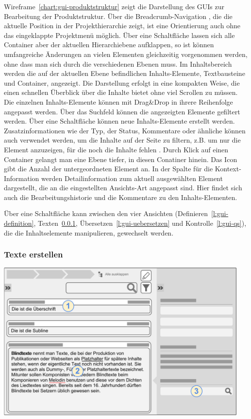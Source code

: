 Wireframe~\ref{chart:gui-produktstruktur} zeigt die Darstellung des GUIs zur Bearbeitung der Produktstruktur. Über die Breadcrumb-Navigation , die die aktuelle Position in der Projekthierarchie zeigt, ist eine Orientierung auch ohne das eingeklappte Projektmenü möglich. Über eine Schaltfläche lassen sich alle Container aber der aktuellen Hierarchiebene aufklappen, so ist können umfangreiche Änderungen an vielen Elementen gleichzeitig vorgenommen werden, ohne dass man sich durch die verschiedenen Ebenen  muss. Im Inhaltsbereich  werden die auf der aktuellen Ebene befindlichen Inhalts-Elemente, Textbausteine und Container, angezeigt. Die Darstellung erfolgt in eine kompakten Weise, die einen schnellen Überblick über die Inhalte bietet ohne viel Scrollen zu müssen. Die einzelnen Inhalts-Elemente können mit Drag\&Drop in ihrere Reihenfolge angepasst werden. Über das Suchfeld  können die angezeigten Elemente gefiltert werden. Über eine Schaltfläche  können neue Inhalts-Elemente erstellt werden. Zusatzinformationen wie der Typ, der Status, Kommentare oder ähnliche können auch verwendet werden, um die Inhalte auf der Seite zu filtern, z.B. um nur die Element anzuzeigen, für die noch die Inhalte fehlen . Durch Klick auf einen Container  gelangt man eine Ebene tiefer, in diesen Conatiner hinein. Das Icon gibt die Anzahl der untergeordneten Element an. In der Spalte für die Kontext-Information  werden Detailinformation zum aktuell ausgewählten Element dargestellt, die an die eingestellten Ansichts-Art angepasst sind. Hier findet sich auch die Bearbeitungshistorie und die Kommentare zu den Inhalts-Elementen.

Über eine Schaltfläche  kann zwischen den vier Ansichten (Definieren~\ref{l:gui-definition}, Texten~\ref{l:gui-texten}, Übersetzen~\ref{l:gui-uebersetzen} und Kontrolle~\ref{l:gui-qs}), die die Inhaltselemente manipulieren, gewechselt werden.

\pagebreak

\subsubsection{Texte erstellen}\label{l:gui-texten}

\begin{center}
\includegraphics[width=0.95\textwidth]{media/GUITexteerstellen.pdf}
\label{chart:gui-texten}
\end{center}

